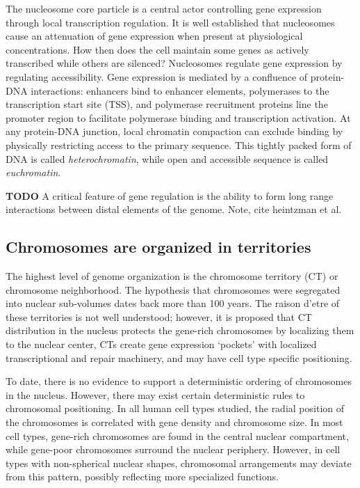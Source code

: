 \documentclass[phd,tocprelim]{cornell}
\begin{document}
The nucleosome core particle is a central actor controlling gene expression
through local transcription regulation.  It is well established that nucleosomes
cause an attenuation of gene expression when present at physiological
concentrations\cite{brown1984}\cite{lorch1987}\cite{laybourn1991}\cite{juan1994}.
How then does the cell maintain some genes as actively transcribed while others
are silenced?  Nucleosomes regulate gene expression by regulating accessibility.
Gene expression is mediated by a confluence of protein-DNA interactions:
enhancers bind to enhancer elements, polymerases to the transcription start
site (TSS), and polymerase recruitment proteins line the promoter region to
facilitate polymerase binding and transcription activation\cite{cox2008}.  At
any protein-DNA junction, local chromatin compaction can exclude binding by
physically restricting access to the primary sequence.  This tightly packed
form of DNA is called \textit{heterochromatin}, while open and accessible
sequence is called \textit{euchromatin}.

\textbf{TODO}
A critical feature of gene regulation is the ability to form long range
interactions between distal elements of the genome.  Note, cite heintzman et al.

\subsection{Chromosomes are organized in territories}

The highest level of genome organization is the chromosome territory (CT) or chromosome neighborhood\cite{cremer2001}.
The hypothesis that chromosomes were segregated into nuclear sub-volumes dates back more than 100
years\cite{cremer1993}.  The raison d'etre of these territories is not well understood; however, it is
proposed that CT distribution in the nucleus protects the gene-rich chromosomes by localizing them to
the nuclear center\cite{boyle2001}\cite{federico2006}, CTs create gene expression `pockets' with localized
transcriptional and repair machinery\cite{bolzer2005}, and may have cell type specific positioning.


To date, there is no evidence to support a deterministic ordering of chromosomes in the nucleus.  However,
there may exist certain deterministic rules to chromosomal positioning.  In all human cell types studied,
the radial position of the chromosomes is correlated with gene density and chromosome size\cite{sun2000}\cite{bolzer2005}.
In most cell types, gene-rich chromosomes are found in the central nuclear compartment, while gene-poor
chromosomes surround the nuclear periphery\cite{boyle2001}\cite{kozubek2005}.  However, in cell types with
non-spherical nuclear shapes, chromosomal arrangements may deviate from this pattern, possibly reflecting
more specialized functions\cite{bolzer2005}.
\end{document}
